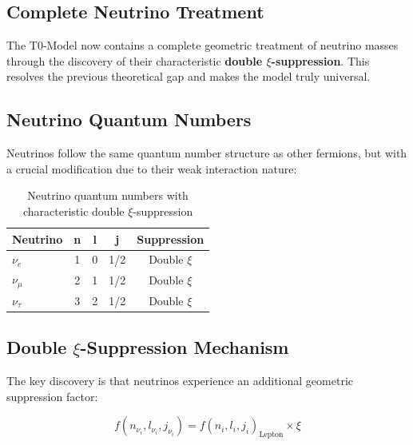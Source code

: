 	\subsection{Complete Neutrino Treatment}
	\label{sec:complete_neutrino_treatment}
	
	\begin{neutrino}
		The T0-Model now contains a complete geometric treatment of neutrino masses through the discovery of their characteristic \textbf{double $\xi$-suppression}. This resolves the previous theoretical gap and makes the model truly universal.
	\end{neutrino}
	
	\subsection{Neutrino Quantum Numbers}
	\label{subsec:neutrino_quantum_numbers}
	
	Neutrinos follow the same quantum number structure as other fermions, but with a crucial modification due to their weak interaction nature:
	
	\begin{table}[H]
		\centering
		\begin{tabular}{lcccc}
			\toprule
			\textbf{Neutrino} & \textbf{n} & \textbf{l} & \textbf{j} & \textbf{Suppression} \\
			\midrule
			$\nu_e$ & 1 & 0 & 1/2 & Double $\xi$ \\
			$\nu_\mu$ & 2 & 1 & 1/2 & Double $\xi$ \\
			$\nu_\tau$ & 3 & 2 & 1/2 & Double $\xi$ \\
			\bottomrule
		\end{tabular}
		\caption{Neutrino quantum numbers with characteristic double $\xi$-suppression}
		\label{tab:neutrino_quantum_numbers}
	\end{table}
	
	\subsection{Double $\xi$-Suppression Mechanism}
	\label{subsec:double_xi_suppression}
	
	The key discovery is that neutrinos experience an additional geometric suppression factor:
	
	\begin{equation}
		f(n_{\nu_i}, l_{\nu_i}, j_{\nu_i}) = f(n_i, l_i, j_i)_{\text{Lepton}} \times \xi
		\label{eq:neutrino_suppression}
	\end{equation}
	
